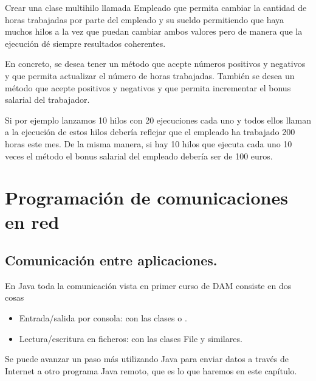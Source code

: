 \documentclass[letterpaper,10pt,spanish]{sphinxmanual}
\begin{document}
Crear una clase multihilo llamada Empleado que permita cambiar la cantidad de horas trabajadas por parte del empleado y su sueldo permitiendo que haya muchos hilos a la vez que puedan cambiar ambos valores pero de manera que la ejecución dé siempre resultados coherentes.

En concreto, se desea tener un método  que acepte números positivos y negativos y que permita actualizar el número de horas trabajadas. También se desea un método  que acepte positivos y negativos y que permita incrementar el bonus salarial del trabajador.

Si por ejemplo lanzamos 10 hilos con 20 ejecuciones cada uno y todos ellos llaman a  la ejecución de estos hilos debería reflejar que el empleado ha trabajado 200 horas este mes. De la misma manera, si hay 10 hilos que ejecuta cada uno 10 veces el método  el bonus salarial del empleado debería ser de 100 euros.


\chapter{Programación de comunicaciones en red}
\label{\detokenize{textos/tema3:programacion-de-comunicaciones-en-red}}\label{\detokenize{textos/tema3::doc}}

\section{Comunicación entre aplicaciones.}
\label{\detokenize{textos/tema3:comunicacion-entre-aplicaciones}}
En Java toda la comunicación vista en primer curso de DAM consiste en dos cosas
\begin{itemize}
\item {} 
Entrada/salida por consola: con las clases  o .

\item {} 
Lectura/escritura en ficheros: con las clases File y similares.

\end{itemize}

Se puede avanzar un paso más utilizando Java para enviar datos a través de Internet a otro programa Java remoto, que es lo que haremos en este capítulo.
\end{document}
